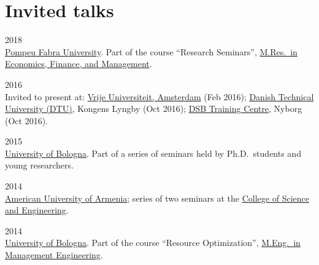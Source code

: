 \section*{Invited talks}

\begin{paracol}{2}
  \textsc{2018}
\switchcolumn
  \\
  \href{https://www.upf.edu}{Pompeu Fabra University}. Part of the course ``Research Seminars'', \href{https://www.upf.edu/web/econ/research-master}{M.Res.\ in Economics, Finance, and Management}.
\end{paracol}

\begin{paracol}{2}
  \textsc{2016}
\switchcolumn
  \\
  Invited to present at: \href{https://www.vu.nl/}{Vrije Universiteit, Amsterdam} (Feb 2016); \href{https://www.dtu.dk/}{Danish Technical University (DTU)}, Kongens Lyngby (Oct 2016); \href{https://www.dsb.dk/}{DSB Training Centre}, Nyborg (Oct 2016).
\end{paracol}

\begin{paracol}{2}
  \textsc{2015}
\switchcolumn
  \\
  \href{https://www.unibo.it}{University of Bologna}. Part of a series of seminars held by Ph.D.\ students and young researchers.
\end{paracol}

\begin{paracol}{2}
  \textsc{2014}
\switchcolumn
  \\
  \href{https://www.aua.am/}{American University of Armenia}; series of two seminars at the \href{http://cse.aua.am/}{College of Science and Engineering}.
\end{paracol}

\begin{paracol}{2}
  \textsc{2014}
\switchcolumn
  \\
  \href{https://www.unibo.it}{University of Bologna}. Part of the course ``Resource Optimization'', \href{https://corsi.unibo.it/magistrale/IngegneriaGestionale}{M.Eng.\ in Management Engineering}.
\end{paracol}
